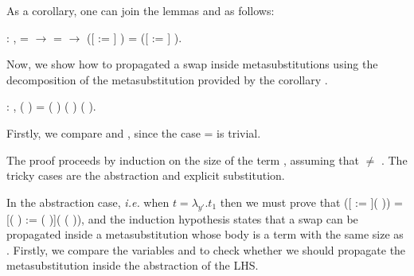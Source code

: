 \begin{coqdoccode}
\coqdocemptyline
\end{coqdoccode}
As a corollary, one can join the lemmas  and  as follows:
\begin{coqdoccode}
\coqdocemptyline
\coqdocnoindent
{} : \coqdockw{\ensuremath{\forall}}     ,  =  \ensuremath{\rightarrow}  =  \ensuremath{\rightarrow} ([ := ] ) = ([ := ] ).\coqdoceol
\coqdocemptyline
\end{coqdoccode}
Now, we show how to propagated a swap inside metasubstitutions using the decomposition of the metasubstitution provided by the corollary .\newline 
\begin{coqdoccode}
\coqdocemptyline
\coqdocnoindent
{} : \coqdockw{\ensuremath{\forall}}     ,    (   ) =  (   ) (   ) (   ).\coqdoceol
\end{coqdoccode}
 Firstly, we compare  and , since the case  =  is trivial.
\begin{coqdoccode}
\end{coqdoccode}
The proof proceeds by induction on the size of the term , assuming that  \ensuremath{\not=} . The tricky cases are the abstraction and explicit substitution. 
\begin{coqdoccode}
\end{coqdoccode}
In the abstraction case, {\it i.e.} when $t = \lambda_{y'}.t_1$ then we must prove that    ([ := ](  )) = [(   ) := (   )](   (  )), and the induction hypothesis states that a swap can be propagated inside a metasubstitution whose body is a term with the same size as . Firstly, we compare the variables  and  to check whether we should propagate the metasubstitution inside the abstraction of the LHS. 

